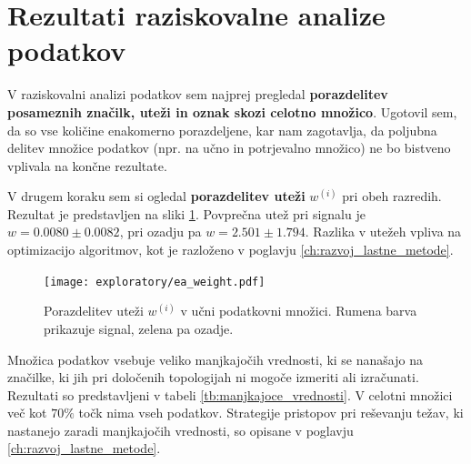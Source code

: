 \documentclass[11pt,a4paper,openany]{book}
\begin{document}
\section{Rezultati raziskovalne analize podatkov}
\label{sec:raziskovalna-analiza}

V raziskovalni analizi podatkov sem najprej pregledal \textbf{porazdelitev posameznih značilk, uteži in oznak skozi celotno množico}. Ugotovil sem, da so vse količine enakomerno porazdeljene, kar nam zagotavlja, da poljubna delitev množice podatkov (npr. na učno in potrjevalno množico) ne bo bistveno vplivala na končne rezultate.

V drugem koraku sem si ogledal \textbf{porazdelitev uteži} $w^{(i)}$ pri obeh razredih. Rezultat je predstavljen na sliki \ref{sl:weight}. Povprečna utež pri signalu je $w = 0.0080 \pm 0.0082$, pri ozadju pa $w = 2.501 \pm 1.794$. Razlika v utežeh vpliva na optimizacijo algoritmov, kot je razloženo v poglavju \ref{ch:razvoj_lastne_metode}.

\begin{figure}[ht]
	\centering
	\texttt{[image: exploratory/ea\_weight.pdf]} 
	\caption{Porazdelitev uteži $w^{(i)}$ v učni podatkovni množici. Rumena barva prikazuje signal, zelena pa ozadje.}
	\label{sl:weight}		
\end{figure}

Množica podatkov vsebuje veliko manjkajočih vrednosti, ki se nanašajo na značilke, ki jih pri določenih topologijah ni mogoče izmeriti ali izračunati. Rezultati so predstavljeni v tabeli \ref{tb:manjkajoce_vrednosti}. V celotni množici več kot $70\%$ točk nima vseh podatkov. Strategije pristopov pri reševanju težav, ki nastanejo zaradi manjkajočih vrednosti, so opisane v poglavju \ref{ch:razvoj_lastne_metode}.
\end{document}
